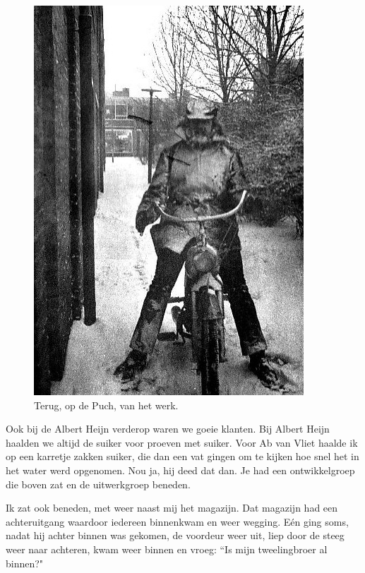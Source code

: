 \documentclass[10pt,twoside, openright]{memoir}
\begin{document}
\begin{figure}[t]
\includegraphics[width=\textwidth]{img/ch40/kat_0002}
\caption*{\footnotesize Terug, op de Puch, van het werk.}
\end{figure}

Ook bij de Albert Heijn verderop waren we goeie klanten. Bij Albert Heijn haalden we altijd de suiker voor proeven met suiker. Voor Ab van Vliet haalde ik op een karretje zakken suiker, die dan een vat gingen om te kijken hoe snel het in het water werd opgenomen. Nou ja, hij deed dat dan. Je had een ontwikkelgroep die boven zat en de uitwerkgroep beneden. 

Ik zat ook beneden, met weer naast mij het magazijn. Dat magazijn had een achteruitgang waardoor iedereen binnenkwam en weer wegging. Eén ging soms, nadat hij achter binnen was gekomen, de voordeur weer uit, liep door de steeg weer naar achteren, kwam weer binnen en vroeg: ``Is mijn tweelingbroer al binnen?"
\end{document}
